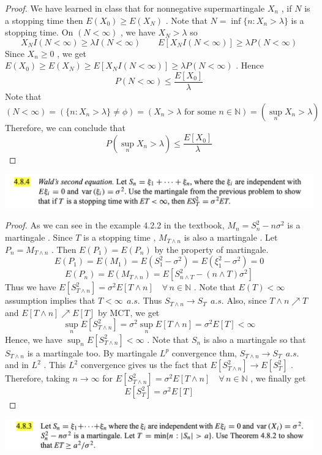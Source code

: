 \documentclass[12pt, A4]{article}
\newcommand{\N}{\mathbb{N}}
\newcommand{\foranyn}{\quad \forall \, n\in \N}
\begin{document}
\begin{proof}
    We have learned in class that for nonnegative supermartingale $X_n$ , if $N$ is a stopping time then $E(X_0)\geq E(X_N)$ . Note that $N= \inf\{n : X_n >\lambda\}$ is a stopping time. On $(N<\infty)$ , we have $X_N >\lambda$ so $$X_NI(N<\infty) \geq \lambda I(N<\infty)\quad \quad  E[X_N I(N<\infty)]\geq \lambda P(N<\infty)$$ Since $X_n\geq 0$ , we get $E(X_0)\geq E(X_N) \geq E[X_N I(N<\infty)]\geq \lambda P(N<\infty)$ . Hence $$P(N<\infty) \leq \frac{E[X_0]}{\lambda}$$ Note that $$(N<\infty) = (\{n : X_n>\lambda\}\neq \phi) = (X_n > \lambda \text{ for some } n\in \N) = (\sup_n X_n >\lambda)$$ Therefore, we can conclude that $$P(\sup_nX_n>\lambda)\leq \frac{E[X_0]}{\lambda} $$
\end{proof}

\vspace{1cm}

\includegraphics[width=17cm]{Exer4.8.4.png}

\begin{proof}
    As we can see in the example 4.2.2 in the textbook, $M_n = S_n^2 -n\sigma^2$ is a martingale . Since $T$ is a stopping time , $M_{T\wedge n}$ is also a martingale . Let $P_n = M_{T\wedge n}$ . Then $E(P_1) = E(P_n)$ by the property of martingale. 
    $$E(P_1) = E(M_1) = E(S_1^2 - \sigma^2) = E(\xi_1^2 - \sigma^2) = 0 $$
    $$E(P_n) = E(M_{T\wedge n}) = E[S_{n\wedge T}^2 -(n\wedge T)\sigma^2]$$
    Thus we have $E[S_{T\wedge n}^2] = \sigma^2 E[T\wedge n]\foranyn$ . Note that $E(T)<\infty$ assumption implies that $T<\infty\;\,a.s.$ Thus $S_{T\wedge n}\rightarrow S_T\;\,a.s.$ Also, since $T\wedge n \nearrow T$ and $E[T\wedge n]\nearrow E[T]$ by MCT, we get $$\sup_n E[S_{T\wedge n}^2] = \sigma^2 \sup_nE[T\wedge n] = \sigma^2 E[T]<\infty $$ Hence, we have $\sup_n E[S_{T\wedge n}^2]<\infty$ . Note that $S_n$ is also a martingale so that $S_{T\wedge n}$ is a martingale too. By martingale $L^p$ convergence thm, $S_{T\wedge n}\rightarrow S_T\;\,a.s.$ and in $L^2$ . This $L^2$ convergence gives us the fact that $E[S_{T\wedge n}^2]\rightarrow E[S_T^2]$ . Therefore, taking $n\rightarrow \infty$ for $E[S_{T\wedge n}^2] = \sigma^2 E[T\wedge n]\foranyn$  , we finally get $$E[S_T^2]=\sigma^2 E[T] $$
\end{proof}

\clearpage
\includegraphics[width=17cm]{Exer4.8.3.png}
\end{document}
